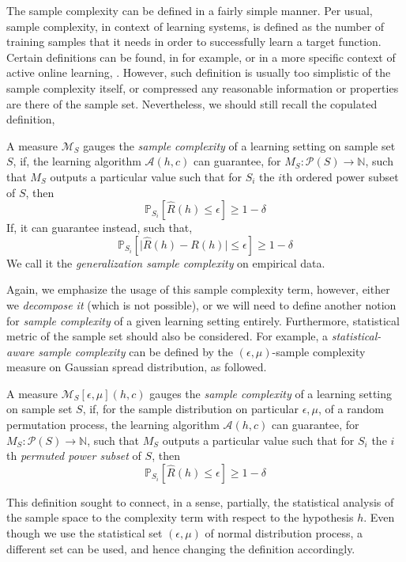 The sample complexity can be defined in a fairly simple manner. Per usual, sample complexity, in context of learning systems, is defined as the number of training samples that it needs in order to successfully learn a target function. Certain definitions can be found, in for example, \cite{huang2025samplecomplexityrepresentationability,wegel2025samplecomplexitysemisupervisedmultiobjective,Mei2022TowardsBridging} or in a more specific context of active online learning, \cite{Balcan2010TrueSampleComplexity}.  However, such definition is usually too simplistic of the sample complexity itself, or compressed any reasonable information or properties are there of the sample set. Nevertheless, we should still recall the copulated definition, 
\begin{definition}
  A measure $\mathcal{M}_{S}$ gauges the \textit{sample complexity} of a learning setting on sample set $S$, if, the learning algorithm $\mathcal{A}(h,c)$ can guarantee, for $M_{S}:\mathcal{P}(S)\to\mathbb{N}$, such that $M_{S}$ outputs a particular value such that for $S_{i}$ the $i$th ordered power subset of $S$, then
  \begin{equation}
    \mathbb{P}_{S_{i}} \left[\hat{R}(h)\leq \epsilon\right] \geq 1 - \delta
  \end{equation}
  If, it can guarantee instead, such that, 
  \begin{equation}
    \mathbb{P}_{S_{i}} \left[\lvert \hat{R}(h) - R(h) \rvert\leq \epsilon\right] \geq 1 - \delta
  \end{equation}
  We call it the \textit{generalization sample complexity} on empirical data. 
\end{definition}
Again, we emphasize the usage of this sample complexity term, however, either we \textit{decompose it} (which is not possible), or we will need to define another notion for \textit{sample complexity} of a given learning setting entirely. Furthermore, statistical metric of the sample set should also be considered. For example, a \textit{statistical-aware sample complexity} can be defined by the $(\epsilon,\mu)$-sample complexity measure on Gaussian spread distribution, as followed. 
\begin{definition}
  A measure $\mathcal{M}_{S}[\epsilon,\mu](h,c)$ gauges the \textit{sample complexity} of a learning setting on sample set $S$, if, for the sample distribution on particular $\epsilon,\mu$, of a random permutation process, the learning algorithm $\mathcal{A}(h,c)$ can guarantee, for $M_{S}:\mathcal{P}(S)\to\mathbb{N}$, such that $M_{S}$ outputs a particular value such that for $S_{i}$ the $i$th \textit{permuted power subset} of $S$, then
  \begin{equation}
    \mathbb{P}_{S_{i}} \left[\hat{R}(h)\leq \epsilon\right] \geq 1 - \delta
  \end{equation}
\end{definition}
This definition sought to connect, in a sense, partially, the statistical analysis of the sample space to the complexity term with respect to the hypothesis $h$. Even though we use the statistical set $(\epsilon,\mu)$ of normal distribution process, a different set can be used, and hence changing the definition accordingly. 
